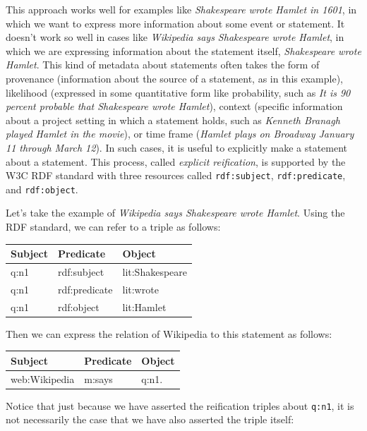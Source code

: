 This approach works well for examples like \emph{Shakespeare wrote
Hamlet in 1601}, in which we want to express more information about some
event or statement. It doesn't work so well in cases like
\emph{Wikipedia says Shakespeare wrote Hamlet}, in which we are
expressing information about the statement itself, \emph{Shakespeare
wrote Hamlet}. This kind of metadata about statements often takes the
form of provenance (information about the source of a statement, as in
this example), likelihood (expressed in some quantitative form like
probability, such as \emph{It is 90 percent probable that Shakespeare
wrote Hamlet}), context (specific information about a project setting in
which a statement holds, such as \emph{Kenneth Branagh played Hamlet in
the movie}), or time frame (\emph{Hamlet plays on Broadway January 11
through March 12}). In such cases, it is useful to explicitly make a
statement about a statement. This process, called \emph{explicit reification},
is supported by the W3C RDF standard with three resources called
\texttt{rdf:subject}, \texttt{rdf:predicate}, and \texttt{rdf:object}.

Let's take the example of \emph{Wikipedia says Shakespeare wrote
Hamlet}. Using the RDF standard, we can refer to a triple as follows:

\phantom{I}

\begin{tabular}{|lll|}
\hline
Subject&Predicate&Object\\
\hline
q:n1&rdf:subject&lit:Shakespeare \\
q:n1&rdf:predicate&lit:wrote \\
q:n1&rdf:object&lit:Hamlet \\
\hline
\end{tabular}

\phantom{I}

Then we can express the relation of Wikipedia to this statement as
follows:

\phantom{I}

\begin{tabular}{|lll|}
\hline
Subject&Predicate&Object\\
\hline
web:Wikipedia&m:says&q:n1.\\
\hline
\end{tabular}

\phantom{I}

Notice that just because we have asserted the reification triples about
\texttt{q:n1}, it is not necessarily the case that we have also asserted the
triple itself:

